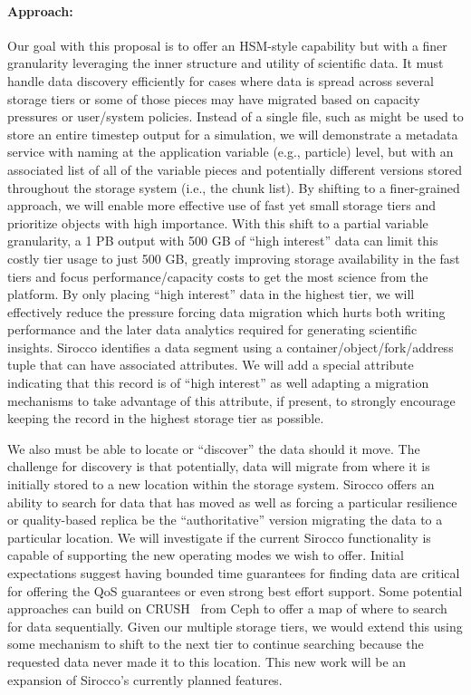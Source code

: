 \paragraph{Approach:}
Our goal with this proposal is to offer an HSM-style capability but with a
finer granularity leveraging the inner structure and utility of scientific
data. It must handle data discovery efficiently for cases where data is spread
across several storage tiers or some of those pieces may have migrated based on
capacity pressures or user/system policies. Instead of a single file, such as
might be used to store an entire timestep output for a simulation, we will
demonstrate a metadata service with naming at the application variable (e.g.,
particle) level, but with an associated list of all of the variable pieces and
potentially different versions stored throughout the storage system (i.e., the
chunk list). By shifting to a finer-grained approach, we will enable more
effective use of fast yet small storage tiers and prioritize objects with high
importance.  With this shift to a partial variable granularity, a 1 PB output
with 500 GB of ``high interest'' data can limit this costly tier usage to just
500 GB, greatly improving storage availability in the fast tiers and focus
performance/capacity costs to get the most science from the platform.  By only
placing ``high interest'' data in the highest tier, we will effectively reduce
the pressure forcing data migration which hurts both writing performance and
the later data analytics required for generating scientific insights.  Sirocco
identifies a data segment using a container/object/fork/address tuple that can
have associated attributes. We will add a special attribute indicating that
this record is of ``high interest'' as well adapting a migration mechanisms to
take advantage of this attribute, if present, to strongly encourage keeping the
record in the highest storage tier as possible. 

We also must be able to locate or ``discover'' the data should it move.  The
challenge for discovery is that potentially, data will migrate from where it is
initially stored to a new location within the storage system.  Sirocco offers
an ability to search for data that has moved as well as forcing a particular
resilience or quality-based replica be the ``authoritative'' version migrating
the data to a particular location. We will investigate if the current Sirocco
functionality is capable of supporting the new operating modes we wish to
offer. Initial expectations suggest having bounded time guarantees for finding
data are critical for offering the QoS guarantees or even strong best effort
support.  Some potential approaches can build on CRUSH~\cite{weil:ceph} from
Ceph to offer a map of where to search for data sequentially. Given our
multiple storage tiers, we would extend this using some mechanism to shift to
the next tier to continue searching because the requested data never made it to
this location. This new work will be an expansion of Sirocco's currently
planned features.


